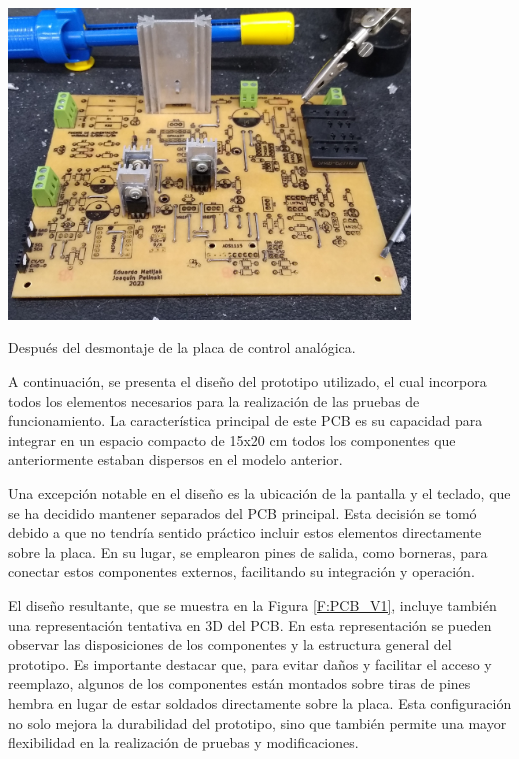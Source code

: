 \begin{foto}[H]
    \centering
    \includegraphics[width=0.8\textwidth]{./imagenes/fotos/desmontada.jpg}
    \caption{Después del desmontaje de la placa de control analógica.}
    \label{F:desmontaje_de_la_placa}
\end{foto}\par 

A continuación, se presenta el diseño del prototipo utilizado, el cual incorpora todos los elementos necesarios para la realización de las pruebas de funcionamiento. La característica principal de este PCB es su capacidad para integrar en un espacio compacto de 15x20 cm todos los componentes que anteriormente estaban dispersos en el modelo anterior. \par 
Una excepción notable en el diseño es la ubicación de la pantalla y el teclado, que se ha decidido mantener separados del PCB principal. Esta decisión se tomó debido a que no tendría sentido práctico incluir estos elementos directamente sobre la placa. En su lugar, se emplearon pines de salida, como borneras, para conectar estos componentes externos, facilitando su integración y operación. \par 
El diseño resultante, que se muestra en la Figura \ref{F:PCB_V1}, incluye también una representación tentativa en 3D del PCB. En esta representación se pueden observar las disposiciones de los componentes y la estructura general del prototipo. Es importante destacar que, para evitar daños y facilitar el acceso y reemplazo, algunos de los componentes están montados sobre tiras de pines hembra en lugar de estar soldados directamente sobre la placa. Esta configuración no solo mejora la durabilidad del prototipo, sino que también permite una mayor flexibilidad en la realización de pruebas y modificaciones. \par 

